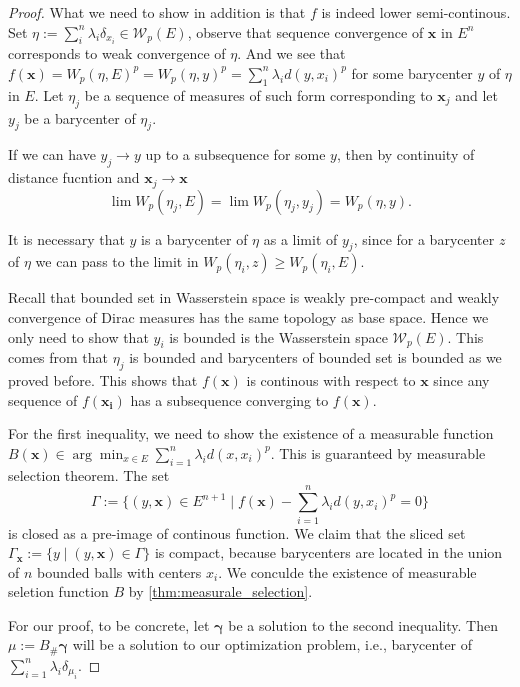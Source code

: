 \begin{proof}
	What we need to show in addition is that $f$ is indeed lower semi-continous. Set $\eta:= \sum_i^{n}\lambda_i \delta_{x_i} \in \mathcal{W}_p(E)$, observe that sequence convergence of $\boldsymbol{x}$ in $E^n$ corresponds to weak convergence of $\eta$. And we see that $f(\boldsymbol{x}) = W_p(\eta, E)^p=W_p(\eta, y)^p = \sum_{1}^{n} \lambda_i d(y, x_i)^p$ for some barycenter $y$ of $\eta$ in $E$. Let $\eta_j$ be a sequence of measures of such form corresponding to $\boldsymbol{x}_j$ and let $y_j$ be a barycenter of $\eta_j$.

	If we can have $y_j \rightarrow y$ up to a subsequence for some $y$, then by continuity of distance fucntion and $\boldsymbol{x}_j \rightarrow \boldsymbol{x}$
	\[
		\lim W_p(\eta_j, E) = \lim W_p(\eta_j, y_j) =  W_p(\eta, y).
	\]

	It is necessary that $y$ is a barycenter of $\eta$ as a limit of $y_j$, since for a barycenter $z$ of $\eta$ we can pass to the limit in $W_p(\eta_i, z) \geq W_p(\eta_i, E)$.


	Recall that bounded set in Wasserstein space is weakly pre-compact and weakly convergence of Dirac measures has the same topology as base space. Hence we only need to show that $y_i$ is bounded is the Wasserstein space $\mathcal{W}_p(E)$. This comes from that $\eta_j$ is bounded and barycenters of bounded set is bounded as we proved before.
	This shows that $f(\boldsymbol{x})$ is continous with respect to $\boldsymbol{x}$ since
	any sequence of $f(\boldsymbol{x_i})$ has a subsequence converging to $f(\boldsymbol{x})$.

	For the first inequality, we need to show the existence of a measurable function $B(\boldsymbol{x}) \in \arg \min_{x \in E} \sum_{i=1}^{n} \lambda_i d(x, x_i)^p$. This is guaranteed by measurable selection theorem. The set
	\[
	\Gamma:=	\{
		(y,\boldsymbol{x}) \in E^{n+1}\mid  f(\boldsymbol{x}) - \sum_{i=1}^{n} \lambda_i d(y,x_i)^p = 0
		\}
	\]
	is closed as a pre-image of continous function.
We claim that the sliced set $\Gamma_{\boldsymbol{x}}:=\{y \mid (y, \boldsymbol{x}) \in \Gamma\}$ is compact,
because barycenters are located in the union of $n$ bounded balls with centers $x_i$.
We conculde the existence of measurable seletion function $B$ by \cref{thm:measurale_selection}.

	For our proof, to be concrete, let $\boldsymbol \gamma$ be a solution to the second inequality.
	Then $\mu:= B_{\#}\boldsymbol \gamma$ will be a solution to our optimization problem, i.e., barycenter of $\sum_{i=1}^{n}\lambda_i \delta_{\mu_i}$.
\end{proof}

